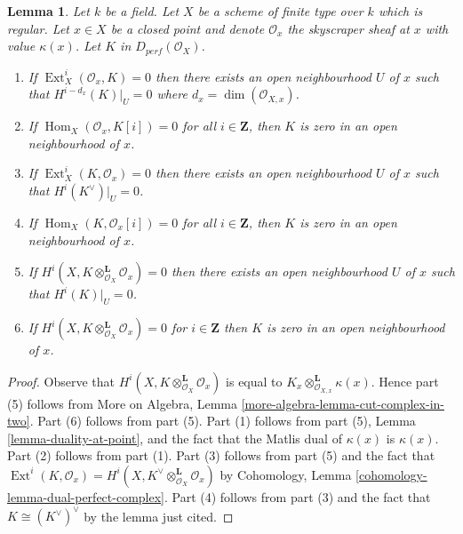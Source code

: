 \documentclass{stacks-project}
\theoremstyle{plain}
\newtheorem{lemma}[subsection]{Lemma}
\theoremstyle{definition}
\theoremstyle{remark}
\numberwithin{equation}{subsection}
\def\Hom{\mathop{\mathrm{Hom}}\nolimits}
\def\Ext{\mathop{\mathrm{Ext}}\nolimits}
\begin{document}
\begin{lemma}
\label{lemma-orthogonal-point-sheaf}
Let $k$ be a field. Let $X$ be a scheme of finite type over $k$ which
is regular. Let $x \in X$ be a closed point and denote $\mathcal{O}_x$
the skyscraper sheaf at $x$ with value $\kappa(x)$. Let $K$ in
$D_{perf}(\mathcal{O}_X)$.
\begin{enumerate}
\item If $\Ext^i_X(\mathcal{O}_x, K) = 0$ then there exists an open
neighbourhood $U$ of $x$ such that $H^{i - d_x}(K)|_U = 0$ where
$d_x = \dim(\mathcal{O}_{X, x})$.
\item If $\Hom_X(\mathcal{O}_x, K[i]) = 0$ for all
$i \in \mathbf{Z}$, then $K$ is zero in an open neighbourhood of $x$.
\item If $\Ext^i_X(K, \mathcal{O}_x) = 0$ then there exists an open
neighbourhood $U$ of $x$ such that $H^i(K^\vee)|_U = 0$.
\item If $\Hom_X(K, \mathcal{O}_x[i]) = 0$ for all
$i \in \mathbf{Z}$, then $K$ is zero in an open neighbourhood of $x$.
\item If $H^i(X, K \otimes_{\mathcal{O}_X}^\mathbf{L} \mathcal{O}_x) = 0$
then there exists an open neighbourhood $U$ of $x$ such that
$H^i(K)|_U = 0$.
\item If $H^i(X, K \otimes_{\mathcal{O}_X}^\mathbf{L} \mathcal{O}_x) = 0$
for $i \in \mathbf{Z}$ then $K$ is zero in an
open neighbourhood of $x$.
\end{enumerate}
\end{lemma}

\begin{proof}
Observe that $H^i(X, K \otimes_{\mathcal{O}_X}^\mathbf{L} \mathcal{O}_x)$
is equal to $K_x  \otimes_{\mathcal{O}_{X, x}}^\mathbf{L} \kappa(x)$.
Hence part (5) follows from More on Algebra, Lemma
\ref{more-algebra-lemma-cut-complex-in-two}.
Part (6) follows from part (5).
Part (1) follows from part (5), Lemma \ref{lemma-duality-at-point}, and the
fact that the Matlis dual of $\kappa(x)$ is $\kappa(x)$.
Part (2) follows from part (1).
Part (3) follows from part (5) and the fact that
$\Ext^i(K, \mathcal{O}_x) =
H^i(X, K^\vee \otimes_{\mathcal{O}_X}^\mathbf{L} \mathcal{O}_x)$ by
Cohomology, Lemma \ref{cohomology-lemma-dual-perfect-complex}.
Part (4) follows from part (3) and the fact that $K \cong (K^\vee)^\vee$
by the lemma just cited.
\end{proof}
\end{document}
